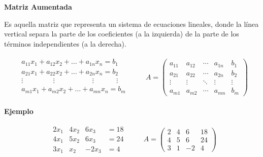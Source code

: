 \documentclass{article}
\begin{document}
\begin{large}
    \textbf{Matriz Aumentada}
\end{large}

Es aquella matriz que representa un sistema de ecuaciones lineales, donde la línea vertical separa la parte de los coeficientes (a la izquierda) de la parte de los términos independientes (a la derecha).

\begin{equation*}
    \begin{matrix}
        \begin{aligned}
            a_{11}x_1 + a_{12}x_2 + \dots + a_{1n}x_n = b_1\\
            a_{21}x_1 + a_{22}x_2 + \dots + a_{2n}x_n = b_2\\
            \vdots \phantom{aaaaaaaa} \vdots \phantom{aaaaaaaaaa} \vdots \phantom{aaaaaa} \vdots\\
            a_{m1}x_1 + a_{m2}x_2 + \dots + a_{mn}x_n = b_m\\
        \end{aligned}
    \end{matrix}
    \quad \quad A = \left(\begin{array}{cccc|c}
        a_{11} & a_{12} & \dotsb & a_{1n} & b_1\\
        a_{21} & a_{22} & \dotsb & a_{2n} & b_2\\
        \vdots & \vdots & \ddots & \vdots & \vdots\\
        a_{m1} & a_{m2} & \dotsb & a_{mn} & b_m
    \end{array}\right)
\end{equation*}

\begin{large}
    \textbf{Ejemplo}
\end{large}

\begin{equation*}
    \begin{matrix}
        \begin{array}{rrrr}
            2x_1 & 4x_2 & 6x_3 &=18\\
            4x_1 & 5x_2 & 6x_3 &=24\\
            3x_1 & x_2  & -2x_3 &=4            
        \end{array}
    \end{matrix}
    \quad \quad A = \left(\begin{array}{rrr|r}
        2 & 4 & 6 & 18\\
        4 & 5 & 6 & 24\\
        3 & 1 & -2& 4
    \end{array}\right)
\end{equation*}
\end{document}
